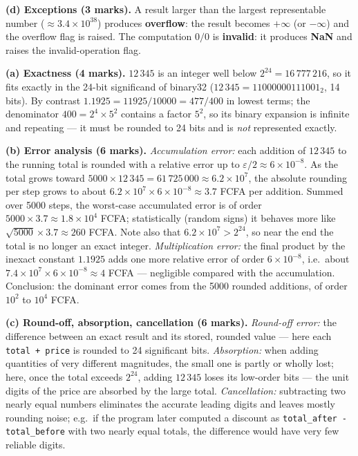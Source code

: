 \documentclass[11pt]{article}
\begin{document}
\begin{corrige}
\textbf{(d) Exceptions (3 marks).} A result larger than the largest representable number ($\approx 3.4\times 10^{38}$) produces \textbf{overflow}: the result becomes $+\infty$ (or $-\infty$) and the overflow flag is raised. The computation $0/0$ is \textbf{invalid}: it produces \textbf{NaN} and raises the invalid-operation flag.
\end{corrige}

\begin{corrige}
\textbf{(a) Exactness (4 marks).} $12\,345$ is an integer well below $2^{24} = 16\,777\,216$, so it fits exactly in the 24-bit significand of binary32 ($12\,345 = 11000000111001_2$, 14 bits). By contrast $1.1925 = 11925/10000 = 477/400$ in lowest terms; the denominator $400 = 2^{4}\times 5^{2}$ contains a factor $5^{2}$, so its binary expansion is infinite and repeating — it must be rounded to 24 bits and is \emph{not} represented exactly.

\textbf{(b) Error analysis (6 marks).} \emph{Accumulation error:} each addition of $12\,345$ to the running total is rounded with a relative error up to $\varepsilon/2 \approx 6\times 10^{-8}$. As the total grows toward $5000\times 12\,345 = 61\,725\,000 \approx 6.2\times 10^{7}$, the absolute rounding per step grows to about $6.2\times 10^{7}\times 6\times 10^{-8} \approx 3.7$ FCFA per addition. Summed over 5000 steps, the worst-case accumulated error is of order $5000\times 3.7 \approx 1.8\times 10^{4}$ FCFA; statistically (random signs) it behaves more like $\sqrt{5000}\times 3.7 \approx 260$ FCFA. Note also that $6.2\times 10^{7} > 2^{24}$, so near the end the total is no longer an exact integer. \emph{Multiplication error:} the final product by the inexact constant $1.1925$ adds one more relative error of order $6\times 10^{-8}$, i.e.\ about $7.4\times 10^{7}\times 6\times 10^{-8} \approx 4$ FCFA — negligible compared with the accumulation. Conclusion: the dominant error comes from the 5000 rounded additions, of order $10^{2}$ to $10^{4}$ FCFA.

\textbf{(c) Round-off, absorption, cancellation (6 marks).} \emph{Round-off error:} the difference between an exact result and its stored, rounded value — here each \texttt{total + price} is rounded to 24 significant bits. \emph{Absorption:} when adding quantities of very different magnitudes, the small one is partly or wholly lost; here, once the total exceeds $2^{24}$, adding $12\,345$ loses its low-order bits — the unit digits of the price are absorbed by the large total. \emph{Cancellation:} subtracting two nearly equal numbers eliminates the accurate leading digits and leaves mostly rounding noise; e.g.\ if the program later computed a discount as \texttt{total\_after - total\_before} with two nearly equal totals, the difference would have very few reliable digits.


\end{corrige}
\end{document}
